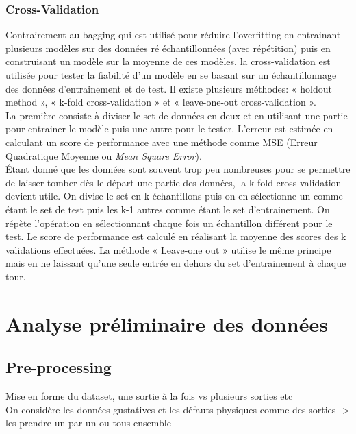 \subsection{Cross-Validation}

Contrairement au bagging qui est utilisé pour réduire l'overfitting en entrainant plusieurs modèles sur des données ré échantillonnées (avec répétition) puis en construisant un modèle sur la moyenne de ces modèles, la cross-validation est utilisée pour tester la fiabilité d'un modèle en se basant sur un échantillonnage des données d'entrainement et de test. Il existe plusieurs méthodes: « holdout method », « k-fold cross-validation » et « leave-one-out cross-validation ».\\

La première consiste à diviser le set de données en deux et en utilisant une partie pour entrainer le modèle puis une autre pour le tester. L'erreur est estimée en calculant un score de performance avec une méthode comme MSE (Erreur Quadratique Moyenne ou \textit{Mean Square Error}). \\

Étant donné que les données sont souvent trop peu nombreuses pour se permettre de laisser tomber dès le départ une partie des données, la k-fold cross-validation devient utile. On divise le set en k échantillons puis on en sélectionne un comme étant le set de test puis les k-1 autres comme étant le set d'entrainement. On répète l'opération en sélectionnant chaque fois un échantillon différent pour le test. Le score de performance est calculé en réalisant la moyenne des scores des k validations effectuées. La méthode « Leave-one out » utilise le même principe mais en ne laissant qu'une seule entrée en dehors du set d'entrainement à chaque tour\cite{hastie_09_elements-of.statistical-learning}. 


\chapter{Analyse préliminaire des données}


\section{Pre-processing}
Mise en forme du dataset, une sortie à la fois vs plusieurs sorties etc \\
On considère les données gustatives et les défauts physiques comme des sorties -> les prendre un par un ou tous ensemble\\

